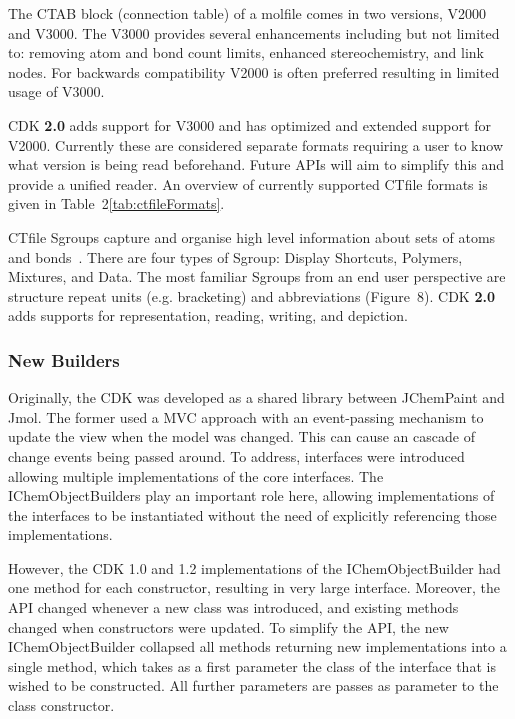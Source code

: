 \documentclass[10pt]{bmcart}
\def \cdkversion {\textbf{2.0}}
\begin{document}
The CTAB block (connection table) of a molfile comes in two versions, V2000
and V3000. The V3000 provides several enhancements including but not
limited to: removing atom and bond count limits, enhanced stereochemistry,
and link nodes. For backwards compatibility V2000 is often preferred resulting
in limited usage of V3000.

CDK \cdkversion{} adds support for V3000 and has optimized and extended
support for V2000. Currently these are considered separate formats requiring
a user to know what version is being read beforehand. Future APIs will aim
to simplify this and provide a unified reader. An overview of currently
supported CTfile formats is given in Table~2\ref{tab:ctfileFormats}.

CTfile Sgroups capture and organise high level information about sets of atoms
and bonds~\cite{Gushurst91}. There are four types of Sgroup: Display Shortcuts, Polymers,
Mixtures, and Data. The most familiar Sgroups from an end user perspective are structure 
repeat units (e.g. bracketing) and abbreviations (Figure~8\label{fig:sgroups}). CDK \cdkversion{} adds 
supports for representation, reading, writing, and depiction.


  \subsubsection*{New Builders}

Originally, the CDK was developed as a shared library between JChemPaint and Jmol. The former
used a MVC approach with an event-passing mechanism to update the view when the model was
changed. This can cause an cascade of change events being passed around. To address,
interfaces were introduced allowing multiple implementations of the core interfaces.
The IChemObjectBuilders play an important role here, allowing implementations of the
interfaces to be instantiated without the need of explicitly referencing those implementations.

However, the CDK 1.0 and 1.2 implementations of the IChemObjectBuilder had one method for
each constructor, resulting in very large interface. Moreover, the API changed whenever
a new class was introduced, and existing methods changed when constructors were updated.
To simplify the API, the new IChemObjectBuilder collapsed all methods returning new
implementations into a single method, which takes as a first parameter the class of the
interface that is wished to be constructed. All further parameters are passes as
parameter to the class constructor.
\end{document}
